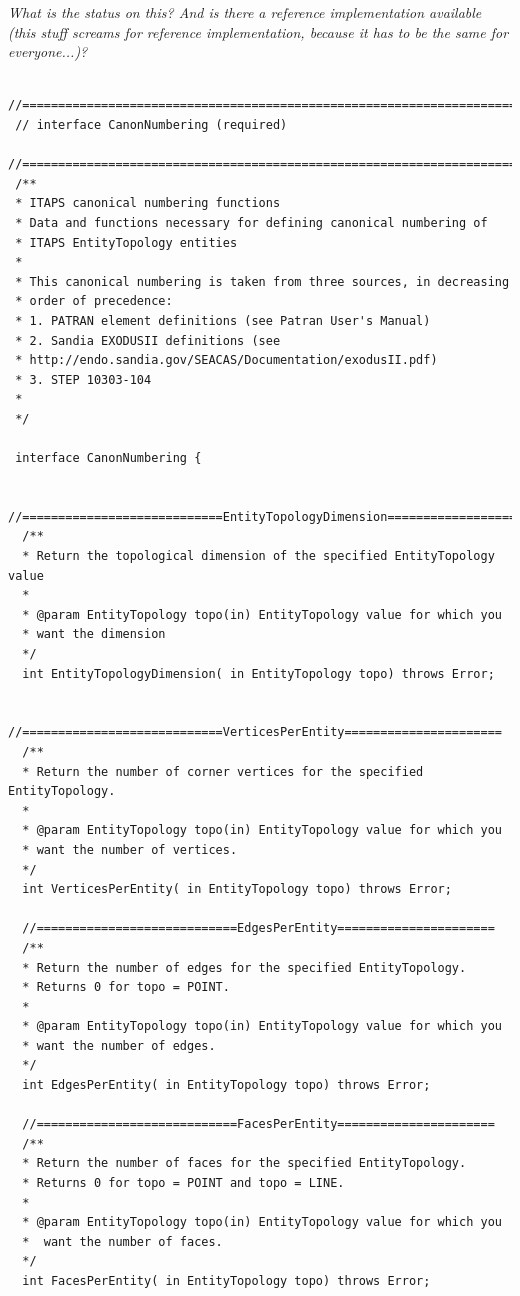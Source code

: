 \documentclass{article}
\begin{document}
\emph{What is the status on this? And is there a reference implementation 
available (this stuff screams for reference implementation, because 
it has to be the same for everyone...)?}

\begin{small}
\begin{verbatim}
 //===========================================================================
 // interface CanonNumbering (required)
 //===========================================================================
 /** 
 * ITAPS canonical numbering functions 
 * Data and functions necessary for defining canonical numbering of 
 * ITAPS EntityTopology entities 
 * 
 * This canonical numbering is taken from three sources, in decreasing 
 * order of precedence: 
 * 1. PATRAN element definitions (see Patran User's Manual) 
 * 2. Sandia EXODUSII definitions (see  
 * http://endo.sandia.gov/SEACAS/Documentation/exodusII.pdf) 
 * 3. STEP 10303-104 
 * 
 */

 interface CanonNumbering {

  //============================EntityTopologyDimension======================
  /** 
  * Return the topological dimension of the specified EntityTopology value 
  * 
  * @param EntityTopology topo(in) EntityTopology value for which you  
  * want the dimension 
  */ 
  int EntityTopologyDimension( in EntityTopology topo) throws Error;

  //============================VerticesPerEntity======================
  /** 
  * Return the number of corner vertices for the specified EntityTopology. 
  * 
  * @param EntityTopology topo(in) EntityTopology value for which you  
  * want the number of vertices. 
  */ 
  int VerticesPerEntity( in EntityTopology topo) throws Error;

  //============================EdgesPerEntity======================
  /** 
  * Return the number of edges for the specified EntityTopology. 
  * Returns 0 for topo = POINT. 
  * 
  * @param EntityTopology topo(in) EntityTopology value for which you  
  * want the number of edges. 
  */ 
  int EdgesPerEntity( in EntityTopology topo) throws Error;

  //============================FacesPerEntity======================
  /** 
  * Return the number of faces for the specified EntityTopology. 
  * Returns 0 for topo = POINT and topo = LINE. 
  * 
  * @param EntityTopology topo(in) EntityTopology value for which you  
  *  want the number of faces. 
  */ 
  int FacesPerEntity( in EntityTopology topo) throws Error;


\end{verbatim}
\end{small}
\end{document}
